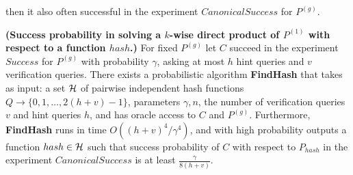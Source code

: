 then it also often successful in the experiment $CanonicalSuccess$ for $P^{(g)}$.
%
\begin{lemma}\textbf{(Success probability in solving a $k$-wise direct product of $P^{(1)}$ with respect to a function $hash$.)}
\label{lemma:hash_function_probability}
For fixed $P^{(g)}$ let $C$ succeed in the experiment $Success$ for $P^{(g)}$ with probability $\gamma$,
asking at most $h$ hint queries and $v$ verification queries.
There exists a probabilistic algorithm \textbf{FindHash} that takes as input: a set $\mathcal{H}$ of pairwise
independent hash functions $Q \rightarrow \{0,1,\dots, 2(h+v)-1\}$, parameters $\gamma, n$,
the number of verification queries $v$ and hint queries $h$, and has
oracle access to $C$ and $P^{(g)}$. Furthermore, \textbf{FindHash} runs in time $O((h+v)^4/\gamma^4)$,
and with high probability outputs a function $hash \in \mathcal{H}$
such that success probability of $C$ with respect to $P_{hash}$ in the experiment $CanonicalSuccess$ is at least $\frac{\gamma}{8(h+v)}$.
\end{lemma}
%
